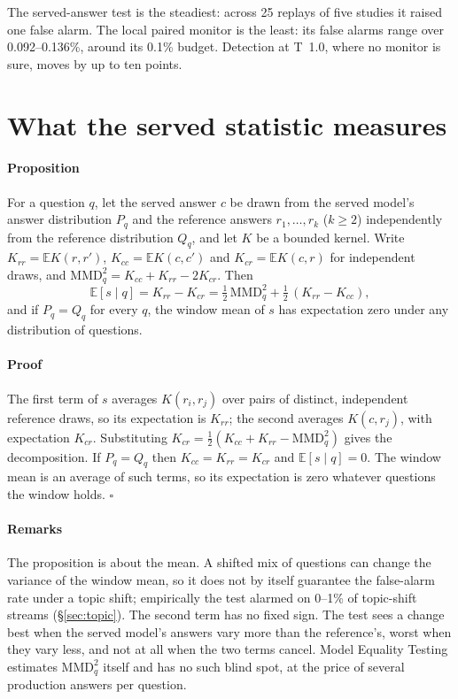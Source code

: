 \documentclass{article}
\begin{document}
\noindent The served-answer test is the steadiest: across 25 replays of five studies
it raised one false alarm. The local paired monitor is the least: its false alarms
range over 0.092--0.136\%, around its 0.1\% budget. Detection at T~1.0, where
no monitor is sure, moves by up to ten points.

\section{What the served statistic measures}
\label{app:theory}

\paragraph{Proposition} For a question $q$, let the served answer $c$ be drawn from
the served model's answer distribution $P_q$ and the reference answers
$r_1,\dots,r_k$ ($k\ge2$) independently from the reference distribution $Q_q$, and let
$K$ be a bounded kernel. Write $K_{rr}=\mathbb{E}K(r,r')$, $K_{cc}=\mathbb{E}K(c,c')$
and $K_{cr}=\mathbb{E}K(c,r)$ for independent draws, and
$\mathrm{MMD}^2_q=K_{cc}+K_{rr}-2K_{cr}$. Then
\[
  \mathbb{E}[s\mid q]=K_{rr}-K_{cr}=\tfrac12\,\mathrm{MMD}^2_q+\tfrac12\,(K_{rr}-K_{cc}),
\]
and if $P_q=Q_q$ for every $q$, the window mean of $s$ has expectation zero under any
distribution of questions.

\paragraph{Proof} The first term of $s$ averages $K(r_i,r_j)$ over pairs of distinct,
independent reference draws, so its expectation is $K_{rr}$; the second averages
$K(c,r_j)$, with expectation $K_{cr}$. Substituting
$K_{cr}=\tfrac12(K_{cc}+K_{rr}-\mathrm{MMD}^2_q)$ gives the decomposition. If
$P_q=Q_q$ then $K_{cc}=K_{rr}=K_{cr}$ and $\mathbb{E}[s\mid q]=0$. The window mean is an
average of such terms, so its expectation is zero whatever questions the window
holds. \hfill$\square$

\paragraph{Remarks} The proposition is about the mean. A shifted mix of questions can
change the variance of the window mean, so it does not by itself guarantee the
false-alarm rate under a topic shift; empirically the test alarmed on 0--1\% of
topic-shift streams (\S\ref{sec:topic}). The second term has no fixed sign. The test
sees a change best when the served model's answers vary more than the reference's,
worst when they vary less, and not at all when the two terms cancel. Model Equality
Testing estimates $\mathrm{MMD}^2_q$ itself and has no such blind spot, at the price
of several production answers per question.
\end{document}
